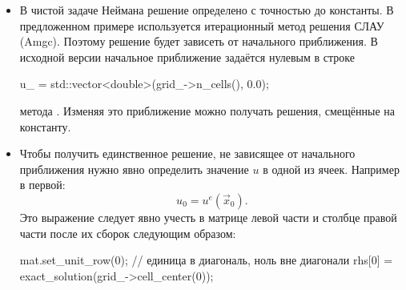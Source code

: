 \begin{itemize}
\begin{cppcode}
{{    } else if (p.x > 1 - 1e-3){
        return ... // q(p) для левой границы
    } ...
}
\end{cppcode}
\item В чистой задаче Неймана решение определено с точностью до константы. В предложенном примере
      используется итерационный метод решения СЛАУ (Amgc). Поэтому решение будет зависеть от начального приближения.
      В исходной версии начальное приближение задаётся нулевым в строке
\begin{cppcode}
u_ = std::vector<double>(grid_->n_cells(), 0.0);
\end{cppcode}
      метода .
      Изменяя это приближение можно получать решения, смещённые на константу.
\item Чтобы получить единственное решение, не зависящее от начального приближения
      нужно явно определить значение $u$ в одной из ячеек. Например в первой:
      \begin{equation*}
          u_0 = u^e(\vec x_0).
      \end{equation*}
      Это выражение следует явно учесть в матрице левой части и столбце правой части после их сборок следующим образом:
\begin{cppcode}
mat.set_unit_row(0); // единица в диагональ, ноль вне диагонали
rhs[0] = exact_solution(grid_->cell_center(0));
\end{cppcode}
\end{itemize}
\label{sec:prog_grid}
